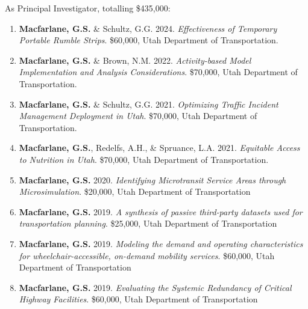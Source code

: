 \documentclass[margin,line]{res}
\newif\ifdetail
\newcounter{enuminitialize}
\newenvironment{myenum}[1][]
{%
 \setcounter{enuminitialize}{#1}
 \addtocounter{enuminitialize}{2}
 \begin{enumerate}[left= 4pt, itemsep=8pt, start=\value{enuminitialize}, label=\arabic*\addtocounter{enumi}{-2}]
}
{%
 \end{enumerate}
}
\begin{document}
\begin{resume}
As Principal Investigator, totalling \$435,000:
\vspace{0.3cm}
\begin{myenum}[8]
  \ifdetail {\color{NavyBlue} \fi
  \item {\textbf{Macfarlane, G.S.} \& Schultz, G.G. 2024. \textit{Effectiveness of Temporary Portable Rumble Strips}. \$60,000, Utah Department of Transportation.}
  \item {\textbf{Macfarlane, G.S.} \& Brown, N.M. 2022. \textit{Activity-based Model Implementation and Analysis Considerations}. \$70,000, Utah Department of Transportation.}
  \ifdetail } \fi
  \item {\textbf{Macfarlane, G.S.} \& Schultz, G.G. 2021. \textit{Optimizing Traffic Incident Management Deployment in Utah}. \$70,000, Utah Department of Transportation.}
  \item {\textbf{Macfarlane, G.S.}, Redelfs, A.H., \& Spruance, L.A. 2021. \textit{Equitable Access to Nutrition in Utah}. \$70,000, Utah Department of Transportation.}
  \item {\textbf{Macfarlane, G.S.} 2020. \textit{ Identifying Microtransit Service Areas
through Microsimulation}. \$20,000, Utah Department of Transportation}
  \item {\textbf{Macfarlane, G.S.} 2019. \textit{ A synthesis of passive third-party datasets
used for transportation planning}. \$25,000, Utah Department of Transportation}
  \item {\textbf{Macfarlane, G.S.} 2019. \textit{ Modeling the demand and operating
characteristics for wheelchair-accessible, on-demand mobility services}.
\$60,000, Utah Department of Transportation}
  \item {\textbf{Macfarlane, G.S.} 2019. \textit{ Evaluating the Systemic Redundancy of
Critical Highway Facilities}. \$60,000, Utah Department of Transportation}
\end{myenum}


\end{resume}
\end{document}
